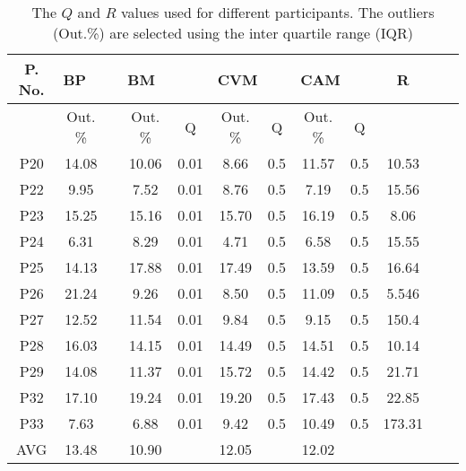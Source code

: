 \documentclass[transmag]{IEEEtran}
\begin{document}
\begin{table*}[h]
	\caption{The $Q$ and $R$ values used for different participants. The outliers (Out.\%) are selected  using the inter quartile range (IQR) }
	\label{table2}
	\begin{center}
		
		
		\begin{tabular}{|c|c|c|c|c|c|c|c|c|c|c|c|} \hline
			\textbf{P. No.}		&	\multicolumn{2}{|l|}{\textbf{\textbf{BP}}} &   \multicolumn{2}{|l|}{\textbf{BM}}       		&  \multicolumn{2}{|l|}{\textbf{\textbf{CVM}}}	& \multicolumn{2}{|l|}{\textbf{\textbf{CAM}}} & {\textbf{R}}	 \\ \hline
			& { Out. \%} & \cellcolor{black} &  { Out.  \%} & {Q} &  { Out.  \%}  & {Q} & { Out.  \%} & {Q} & {} \\ \hline

			P20	& 14.08  & 	\cellcolor{black} & 10.06 & 0.01  & 8.66  & 0.5  & 11.57 & 0.5   & 10.53\\ \hline	
			P22	& 9.95   &  \cellcolor{black} & 7.52  & 0.01 & 8.76  &  0.5 & 7.19  &  0.5  & 15.56\\ \hline
			P23	& 15.25  &  \cellcolor{black} & 15.16 & 0.01 & 15.70 &  0.5 & 16.19 &  0.5  & 8.06 \\ \hline
			P24	& 6.31   & \cellcolor{black}  & 8.29  & 0.01 & 4.71  &  0.5  & 6.58  & 0.5  &  15.55\\ \hline
			P25	& 14.13  & \cellcolor{black} & 17.88 & 0.01 & 17.49 & 0.5  & 13.59 & 0.5   &  16.64 \\ \hline
			P26	& 21.24  &  \cellcolor{black} & 9.26  & 0.01 & 8.50  &  0.5 & 11.09 &  0.5  & 5.546 \\ \hline
			P27	& 12.52  &  \cellcolor{black} & 11.54 & 0.01 & 9.84  &  0.5 & 9.15  &  0.5  & 150.4\\ \hline
			P28	& 16.03  &  \cellcolor{black} & 14.15 & 0.01 & 14.49 &  0.5 & 14.51 &  0.5  &  10.14\\ \hline
			P29	& 14.08  &  \cellcolor{black} & 11.37 & 0.01 & 15.72 &  0.5 & 14.42 &  0.5  & 21.71\\ \hline	
			P32	& 17.10  & \cellcolor{black} & 19.24 & 0.01   & 19.20 & 0.5   & 17.43 & 0.5 & 22.85\\ \hline
			P33	& 7.63   & \cellcolor{black} & 6.88  & 0.01 & 9.42	 & 0.5 & 10.49 & 0.5 & 173.31\\ \hline
			
			AVG	& 13.48  & \cellcolor{black} & 10.90	& \cellcolor{black} & 12.05 & \cellcolor{black} & 12.02	& \cellcolor{black}	& \cellcolor{black} \\  \hline
		\end{tabular}
	\end{center}
	
\end{table*}
\end{document}
